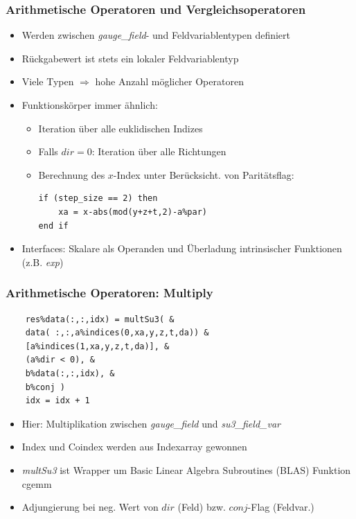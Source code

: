 \documentclass[10pt]{beamer}
\begin{document}
\begin{frame}[fragile]
    \frametitle{Arithmetische Operatoren und Vergleichsoperatoren}
        \begin{itemize}
        	\item Werden zwischen \emph{gauge\_field}- und Feldvariablentypen definiert
        	\item Rückgabewert ist stets ein lokaler Feldvariablentyp
        	\item Viele Typen $\Rightarrow$ hohe Anzahl möglicher Operatoren
        	\item Funktionskörper immer ähnlich:
        	\begin{itemize}
        		\item Iteration über alle euklidischen Indizes
        		\item Falls $dir = 0$: Iteration über alle Richtungen
        		\item Berechnung des $x$-Index unter Berücksicht. von Paritätsflag:
        		\begin{lstlisting}[aboveskip=0em,abovecaptionskip=0em]
if (step_size == 2) then
	xa = x-abs(mod(y+z+t,2)-a%par)
end if
    			\end{lstlisting}
        	\end{itemize}
        	\item Interfaces: Skalare als Operanden und Überladung intrinsischer Funktionen (z.B. \emph{exp})
        \end{itemize}
\end{frame}

\begin{frame}[fragile]
    \frametitle{Arithmetische Operatoren: Multiply}
    \begin{minipage}{0.48\linewidth}
    \begin{lstlisting}
	res%data(:,:,idx) = multSu3( &
	data( :,:,a%indices(0,xa,y,z,t,da)) &
	[a%indices(1,xa,y,z,t,da)], &
	(a%dir < 0), &
	b%data(:,:,idx), &
	b%conj )
	idx = idx + 1
    \end{lstlisting}
    \end{minipage}
    \hfill
    \begin{minipage}{0.48\linewidth}
        \begin{itemize}
        	\item Hier: Multiplikation zwischen \emph{gauge\_field} und \emph{su3\_field\_var}
        	\item Index und Coindex werden aus Indexarray gewonnen
        	\item \emph{multSu3} ist Wrapper um Basic Linear Algebra Subroutines (BLAS) Funktion cgemm
        	\item Adjungierung bei neg. Wert von $dir$ (Feld) bzw. $conj$-Flag (Feldvar.)
        \end{itemize}
    \end{minipage}
\end{frame}
\end{document}
